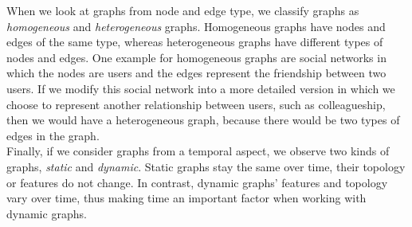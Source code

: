 When we look at graphs from node and edge type, we classify graphs as \emph{homogeneous} and \emph{heterogeneous} graphs. Homogeneous graphs have nodes and edges of the same type, whereas heterogeneous graphs have different types of nodes and edges. One example for homogeneous graphs are social networks in which the nodes are users and the edges represent the friendship between two users. If we modify this social network into a more detailed version in which we choose to represent another relationship between users, such as colleagueship, then we would have a heterogeneous graph, because there would be two types of edges in the graph.\\
Finally, if we consider graphs from a temporal aspect, we observe two kinds of graphs, \emph{static} and \emph{dynamic}. Static graphs stay the same over time, their topology or features do not change. In contrast, dynamic graphs' features and topology vary  over time, thus making time an important factor when working with dynamic graphs.

